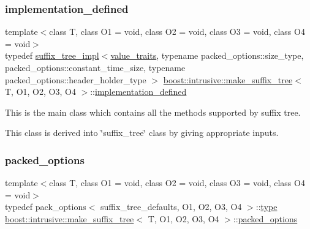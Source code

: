\subsubsection{\texorpdfstring{implementation\+\_\+defined}{implementation\_defined}}
{\footnotesize\ttfamily template$<$class T, class O1 = void, class O2 = void, class O3 = void, class O4 = void$>$ \\
typedef \hyperlink{classboost_1_1intrusive_1_1suffix__tree__impl}{suffix\+\_\+tree\+\_\+impl}$<$\hyperlink{structboost_1_1intrusive_1_1make__suffix__tree_a9274e519ecd5f67199f45a6b29c86c04}{value\+\_\+traits}, typename packed\+\_\+options\+::size\+\_\+type, packed\+\_\+options\+::constant\+\_\+time\+\_\+size, typename packed\+\_\+options\+::header\+\_\+holder\+\_\+type $>$ \hyperlink{structboost_1_1intrusive_1_1make__suffix__tree}{boost\+::intrusive\+::make\+\_\+suffix\+\_\+tree}$<$ T, O1, O2, O3, O4 $>$\+::\hyperlink{structboost_1_1intrusive_1_1make__suffix__tree_a4f100a03f40c26d5b31299af18214df1}{implementation\+\_\+defined}}


\begin{DoxyItemize}
\item This is the main class which contains all the methods supported by suffix tree. 
\item This class is derived into \char`\"{}suffix\+\_\+tree\char`\"{} class by giving appropriate inputs. 
\end{DoxyItemize}\mbox{\label{structboost_1_1intrusive_1_1make__suffix__tree_ad2983281b8c78b0c85e4854e40207ffd}} 
\subsubsection{\texorpdfstring{packed\+\_\+options}{packed\_options}}
{\footnotesize\ttfamily template$<$class T, class O1 = void, class O2 = void, class O3 = void, class O4 = void$>$ \\
typedef pack\+\_\+options$<$ suffix\+\_\+tree\+\_\+defaults, O1, O2, O3, O4 $>$\+::\hyperlink{structboost_1_1intrusive_1_1make__suffix__tree_af7a1a8fa230f6e5be3305bdc0f8287b1}{type} \hyperlink{structboost_1_1intrusive_1_1make__suffix__tree}{boost\+::intrusive\+::make\+\_\+suffix\+\_\+tree}$<$ T, O1, O2, O3, O4 $>$\+::\hyperlink{structboost_1_1intrusive_1_1make__suffix__tree_ad2983281b8c78b0c85e4854e40207ffd}{packed\+\_\+options}}

